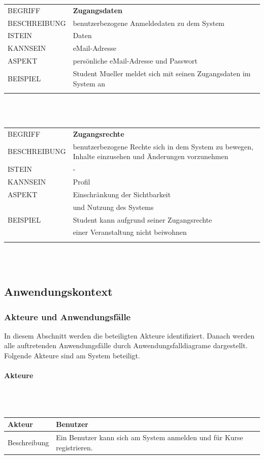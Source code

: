 \documentclass[12pt,a4paper]{article}
\begin{document}
\begin{tabular}{l p{12cm}}
	BEGRIFF 	 & \textbf{Zugangsdaten} \\ 
	BESCHREIBUNG & benutzerbezogene Anmeldedaten zu dem System\\ 
	ISTEIN   	 & Daten\\
	KANNSEIN 	 & eMail-Adresse\\  
	ASPEKT   	 & persönliche eMail-Adresse und Passwort\\
	BEISPIEL 	 & Student Mueller meldet sich mit seinen Zugangsdaten im System 				   an\\\\
	\hline
\end{tabular}\\\\  

\begin{tabular}{l p{12cm}}
	BEGRIFF 	 & \textbf{Zugangsrechte} \\ 
	BESCHREIBUNG & benutzerbezogene Rechte sich in dem System zu bewegen, Inhalte einzusehen und Änderungen vorzunehmen \\ 
	ISTEIN   	 & - \\
	KANNSEIN 	 & Profil\\ 
	ASPEKT   	 & Einschränkung der Sichtbarkeit\\
	& und Nutzung des Systems \\
	BEISPIEL 	 & Student kann aufgrund seiner Zugangsrechte\\
	& einer Veranstaltung nicht beiwohnen\\\\
	\hline
\end{tabular}\\\\ 

\subsection{Anwendungskontext}
\subsubsection{Akteure und Anwendungsfälle}
In diesem Abschnitt werden die beteiligten Akteure identifiziert. Danach werden alle auftretenden Anwendungsfälle durch Anwendungsfalldiagrame dargestellt.
Folgende Akteure sind am System beteiligt.\\
\paragraph{Akteure}
\mbox{}\\\\
\begin{tabular}{l p{12cm}}
	Akteur & \textbf{Benutzer} \\ 
	\hline Beschreibung & Ein Benutzer kann sich am System anmelden und für Kurse registrieren. \\ 
\end{tabular}\\\\
\end{document}
